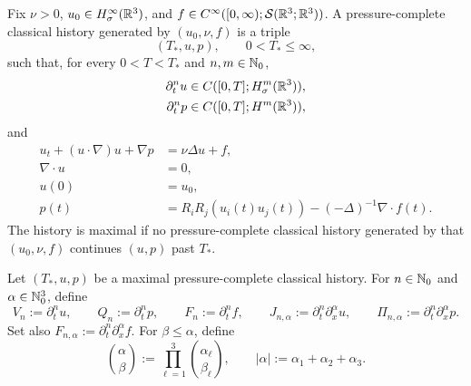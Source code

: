 \begin{samepage}
\begin{definition}
\label{f:def:formal-maximal-history}
Fix \(\nu>0\), \(u_0\in H^\infty_\sigma(\mathbb R^3)\), and
\(f\in C^\infty([0,\infty);\mathcal S(\mathbb R^3;\mathbb R^3))\).  A
pressure-complete classical history generated by \((u_0,\nu,f)\) is a triple
\[
 (T_*,u,p),
 \qquad
 0<T_*\le\infty,
\]
such that, for every \(0<T<T_*\) and \(n,m\in\mathbb N_0\),
\begin{align*}
 \partial_t^nu&\in C([0,T];H^m_\sigma(\mathbb R^3)),\\
 \partial_t^np&\in C([0,T];H^m(\mathbb R^3)),
\end{align*}
and
\begin{align}
 u_t+(u\cdot\nabla)u+\nabla p&=\nu\Delta u+f,
 \label{f:eq:formal-history-momentum}\\
 \nabla\cdot u&=0,
 \label{f:eq:formal-history-divergence}\\
 u(0)&=u_0,
 \label{f:eq:formal-history-datum}\\
 p(t)&=R_iR_j(u_i(t)u_j(t))
 -(-\Delta)^{-1}\nabla\cdot f(t).
 \label{f:eq:formal-history-pressure}
\end{align}
The history is maximal if no pressure-complete classical history generated by
that \((u_0,\nu,f)\) continues \((u,p)\) past \(T_*\).
\end{definition}
\end{samepage}

\begin{definition}
\label{f:def:formal-mixed-jet}
Let \((T_*,u,p)\) be a maximal pressure-complete classical history.  For
\(n\in\mathbb N_0\) and \(\alpha\in\mathbb N_0^3\), define
\[
 V_n:=\partial_t^nu,
 \qquad
 Q_n:=\partial_t^np,
 \qquad
 F_n:=\partial_t^nf,
 \qquad
 J_{n,\alpha}:=\partial_t^n\partial_x^\alpha u,
 \qquad
 \Pi_{n,\alpha}:=\partial_t^n\partial_x^\alpha p.
\]
Set also \(F_{n,\alpha}:=\partial_t^n\partial_x^\alpha f\).
For \(\beta\le\alpha\), define
\[
 \binom{\alpha}{\beta}
 :=\prod_{\ell=1}^3\binom{\alpha_\ell}{\beta_\ell},
 \qquad
 |\alpha|:=\alpha_1+\alpha_2+\alpha_3.
\]
\end{definition}

